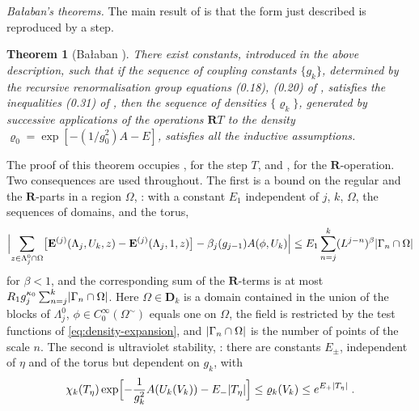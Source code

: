 \documentclass[11pt]{preprint}
\DeclarePairedDelimiter{\abs}{\lvert}{\rvert}
\numberwithin{equation}{section}
\newtheorem{theorem}{Theorem}[section]
\theoremstyle{definition}
\theoremstyle{remark}
\theoremstyle{plain}
\begin{document}
\emph{Ba{\l}aban's theorems.} The main result of \cite{BalabanCRE} is that the form just described is reproduced by a step.

\begin{theorem}[Ba{\l}aban {\cite[Theorem~1, p.~262]{BalabanCRE}}]\label{thm:balaban-inductive}
There exist constants, introduced in the above description, such that if the sequence of coupling constants $\{ g_k \}$, determined by the recursive renormalisation group equations (0.18), (0.20) of \cite{BalabanRG1}, satisfies the inequalities (0.31) of \cite{BalabanRG1}, then the sequence of densities $\{ \varrho_k \}$, generated by successive applications of the operations $\mathbf RT$ to the density $\varrho_0 = \exp[-(1/g_0^2)A - E]$, satisfies all the inductive assumptions.
\end{theorem}

The proof of this theorem occupies \cite{BalabanCRE}, for the step $T$, and \cite{BalabanLFR1,BalabanLFR2}, for the $\mathbf R$-operation. Two consequences are used throughout. The first is a bound on the regular and the $\mathbf R$-parts in a region $\Omega$, \cite[Theorem~2, (2.43), (2.44), p.~263]{BalabanCRE}: with a constant $E_1$ independent of $j$, $k$, $\Omega$, the sequences of domains, and the torus,
\begin{equation}\label{eq:balaban-theorem-two}
    \Bigl\lvert\sum_{z \in \Lambda_j^0 \cap \Omega}\bigl[\mathbf E^{(j)}(\Lambda_j, U_k, z) - \mathbf E^{(j)}(\Lambda_j, 1, z)\bigr] - \beta_j(g_{j-1})A(\phi, U_k)\Bigr\rvert \leq E_1\sum_{n=j}^{k}(L^{j-n})^{\beta}\abs{\Gamma_n \cap \Omega}
\end{equation}
for $\beta < 1$, and the corresponding sum of the $\mathbf R$-terms is at most $R_1g_j^{\kappa_0}\sum_{n=j}^{k}\abs{\Gamma_n \cap \Omega}$. Here $\Omega \in \mathbf D_k$ is a domain contained in the union of the blocks of $\Lambda_j^0$, $\phi \in C_0^\infty(\Omega^{\sim})$ equals one on $\Omega$, the field is restricted by the test functions of \eqref{eq:density-expansion}, and $\abs{\Gamma_n \cap \Omega}$ is the number of points of the scale $n$. The second is ultraviolet stability, \cite[Corollary~3, (2.50), p.~264]{BalabanCRE}: there are constants $E_\pm$, independent of $\eta$ and of the torus but dependent on $g_k$, with
\begin{equation}\label{eq:ultraviolet-stability}
    \chi_k(T_\eta)\exp\Bigl[-\frac{1}{g_k^2}A(U_k(V_k)) - E_-\abs{T_\eta}\Bigr] \leq \varrho_k(V_k) \leq e^{E_+\abs{T_\eta}}\;.
\end{equation}
\end{document}

